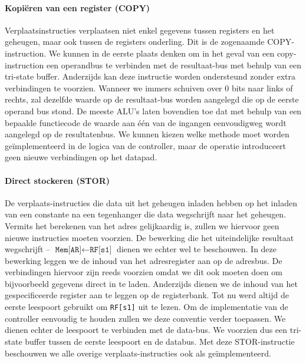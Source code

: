 \paragraph{Kopi\"eren van een register (COPY)}
Verplaatsinstructies verplaatsen niet enkel gegevens tussen registers en het geheugen, maar ook tussen de registers onderling. Dit is de zogenaamde COPY-instruction. We kunnen in de eerste plaats denken om in het geval van een copy-instruction een operandbus te verbinden met de resultaat-bus met behulp van een tri-state buffer. Anderzijds kan deze instructie worden ondersteund zonder extra verbindingen te voorzien. Wanneer we immers schuiven over $0$ bits naar links of rechts, zal dezelfde waarde op de resultaat-bus worden aangelegd die op de eerste operand bus stond. De meeste ALU's laten bovendien toe dat met behulp van een bepaalde functiecode de waarde aan \'e\'en van de ingangen eenvoudigweg wordt aangelegd op de resultatenbus. We kunnen kiezen welke methode moet worden ge\"implementeerd in de logica van de controller, maar de operatie introduceert geen nieuwe verbindingen op het datapad.
\paragraph{Direct stockeren (STOR)}
De verplaats-instructies die data uit het geheugen inladen hebben op het inladen van een constante na een tegenhanger die data wegschrijft naar het geheugen. Vermits het berekenen van het adres gelijkaardig is, zullen we hiervoor geen nieuwe instructies moeten voorzien. De bewerking die het uiteindelijke resultaat wegschrijft -- $\texttt{Mem[AR]}\leftarrow\texttt{RF[s1]}$ dienen we echter wel te beschouwen. In deze bewerking leggen we de inhoud van het adresregister aan op de adresbus. De verbindingen hiervoor zijn reeds voorzien omdat we dit ook moeten doen om bijvoorbeeld gegevens direct in te laden. Anderzijds dienen we de inhoud van het gespecificeerde register aan te leggen op de registerbank. Tot nu werd altijd de eerste leespoort gebruikt om \verb+RF[s1]+ uit te lezen. Om de implementatie van de controller eenvoudig te houden zullen we deze conventie verder toepassen. We dienen echter de leespoort te verbinden met de data-bus. We voorzien dus een tri-state buffer tussen de eerste leespoort en de databus. Met deze STOR-instructie beschouwen we alle overige verplaats-instructies ook als ge\"implementeerd.
